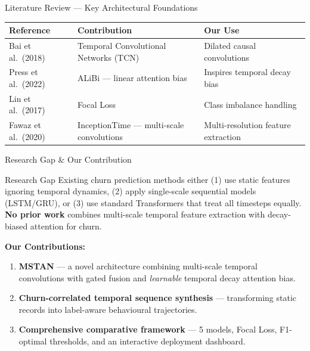 \documentclass[aspectratio=169,11pt]{beamer}
\begin{document}
\begin{frame}{Literature Review — Key Architectural Foundations}
\begin{table}[h]
\centering
\small
\begin{tabular}{p{3.2cm} p{4.5cm} p{4cm}}
\toprule
\textbf{Reference} & \textbf{Contribution} & \textbf{Our Use} \\
\midrule
Bai et al.\ (2018) \cite{bai2018} & Temporal Convolutional Networks (TCN) & Dilated causal convolutions \\[4pt]
Press et al.\ (2022) \cite{press2022} & ALiBi — linear attention bias & Inspires temporal decay bias \\[4pt]
Lin et al.\ (2017) \cite{lin2017} & Focal Loss & Class imbalance handling \\[4pt]
Fawaz et al.\ (2020) \cite{fawaz2020} & InceptionTime — multi-scale convolutions & Multi-resolution feature extraction \\
\bottomrule
\end{tabular}
\end{table}
\end{frame}

\begin{frame}{Research Gap \& Our Contribution}
\begin{block}{Research Gap}
Existing churn prediction methods either (1) use static features ignoring temporal dynamics, (2) apply single-scale sequential models (LSTM/GRU), or (3) use standard Transformers that treat all timesteps equally. \textbf{No prior work} combines multi-scale temporal feature extraction with decay-biased attention for churn.
\end{block}
\vspace{8pt}
\textbf{Our Contributions:}
\begin{enumerate}
    \item \textbf{MSTAN} — a novel architecture combining multi-scale temporal convolutions with gated fusion and \emph{learnable} temporal decay attention bias.
    \item \textbf{Churn-correlated temporal sequence synthesis} — transforming static records into label-aware behavioural trajectories.
    \item \textbf{Comprehensive comparative framework} — 5 models, Focal Loss, F1-optimal thresholds, and an interactive deployment dashboard.
\end{enumerate}
\end{frame}
\end{document}
